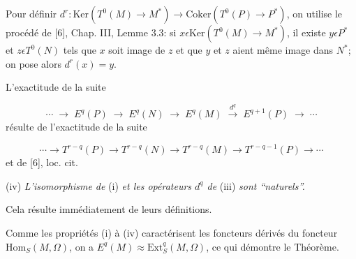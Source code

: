 Pour définir $d^r\colon \mathrm{Ker}(T^0(M) \to M^*) \to \mathrm{Coker}(T^0(P) \to P^*)$, on utilise le procédé de [6], Chap. III, Lemme 3.3: si $x \epsilon \mathrm{Ker}(T^0(M) \to M^*)$, il existe $y \epsilon P^*$ et $z \epsilon T^0(N)$ tels que $x$ soit image de $z$ et que $y$ et $z$ aient même image dans $N^*$; on pose alors $d^r(x) = y$.

L'exactitude de la suite

\begin{equation*}
\cdots \;\to\; E^q(P) \;\to\; E^q(N) \;\to\; E^q(M) \;\xrightarrow{\ d^q\ }\; E^{q+1}(P) \;\to\; \cdots
\end{equation*}
résulte de l'exactitude de la suite

\begin{equation*}
\cdots \to T^{r-q}(P) \to T^{r-q}(N) \to T^{r-q}(M) \to T^{r-q-1}(P) \to \cdots
\end{equation*}
et de [6], loc. cit.

(iv) \textit{L'isomorphisme de} (i) \textit{et les opérateurs $d^q$ de} (iii) \textit{sont ``naturels''.}

Cela résulte immédiatement de leurs définitions.



%
%
%
%
Comme les propriétés (i) à (iv) caractérisent les foncteurs dérivés du foncteur $\mathrm{Hom}_S(M, \Omega)$, on a $E^q(M) \approx \mathrm{Ext}_S^q(M, \Omega)$, ce qui démontre le Théorème.

